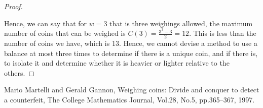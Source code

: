 \documentclass[name=Mehul\ Arora, andrewid=mehul21066, course=CSE121, num=1]{homework}
\begin{document}
\begin{proof}
\begin{itemize}[label=$\lozenge$, itemsep=2ex]
    \end{itemize}
    Hence, we can say that for $w=3$ that is three weighings allowed, the maximum number of coins that can be weighed is $C(3)=\frac{3^{3}-3}{2}=12$. This is less than the number of coins we have, which is 13. Hence, we cannot devise a method to use a balance at most three times to determine if there is a unique coin, and if there is, to isolate it and determine whether it is heavier or lighter relative to the others.
\end{proof}
\begin{thebibliography}{9}
    Mario Martelli and Gerald Gannon, Weighing coins: Divide and conquer to detect a counterfeit, The College Mathematics Journal, Vol.28,
No.5, pp.365–367, 1997.
\end{thebibliography}
\end{document}
